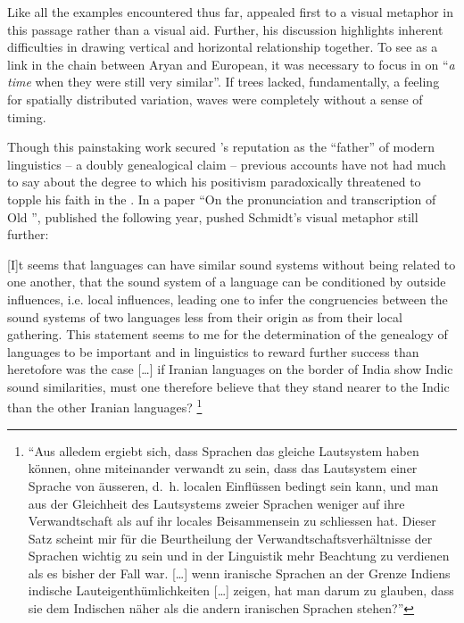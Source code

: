 \documentclass[output=paper]{langscibook}
\begin{document}
Like all the examples encountered thus far, {} appealed first to a visual metaphor in this passage rather than a visual aid. Further, his discussion highlights inherent difficulties in drawing vertical and horizontal relationship together. To see {\Armenian} as a link in the chain between Aryan and European, it was necessary to focus in on ``\emph{a time} when they were still very similar''. If trees lacked, fundamentally, a feeling for spatially distributed variation, waves were completely without a sense of timing.

Though this painstaking work secured {}'s reputation as the ``father'' of modern {\Armenian} linguistics -- a doubly genealogical claim -- previous accounts have not had much to say about the degree to which his positivism paradoxically threatened to topple his faith in the . In a paper ``On the pronunciation and transcription of Old {\Armenian}'', published the following year, {} pushed Schmidt's visual metaphor still further:

\begin{modquote}{}
[I]t seems that languages can have similar sound systems without being related to one another, that the sound system of a language can be conditioned by outside influences, i.e. local influences, leading one to infer the congruencies between the sound systems of two languages less from their origin as from their local gathering. This statement seems to me for the determination of the genealogy of languages to be important and in linguistics to reward further success than heretofore was the case […] if Iranian languages on the border of India show Indic sound similarities, must one therefore believe that they stand nearer to the Indic than the other Iranian languages? \citep[73]{Huebschmann1876}\footnote{``Aus alledem ergiebt sich, dass Sprachen das gleiche Lautsystem haben können, ohne miteinander verwandt zu sein, dass das Lautsystem einer Sprache von äusseren, d.~h. localen Einflüssen bedingt sein kann, und man aus der Gleichheit des Lautsystems zweier Sprachen weniger auf ihre Verwandtschaft als auf ihr locales Beisammensein zu schliessen hat. Dieser Satz scheint mir für die Beurtheilung der Verwandtschaftsverhältnisse der Sprachen wichtig zu sein und in der Linguistik mehr Beachtung zu verdienen als es bisher der Fall war. […] wenn iranische Sprachen an der Grenze Indiens indische Lauteigenthümlichkeiten […] zeigen, hat man darum zu glauben, dass sie dem Indischen näher als die andern iranischen Sprachen stehen?''}
\end{modquote}
\end{document}
